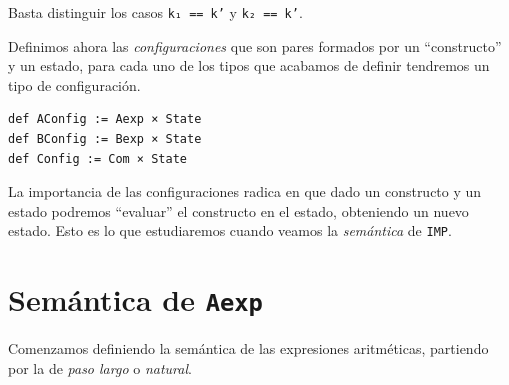 \documentclass[../main.tex]{subfiles}
\begin{document}
Basta distinguir los casos \texttt{k₁ == k'} y \texttt{k₂ == k'}.

Definimos ahora las \emph{configuraciones} que son pares formados por un 
\enquote{constructo} y un estado, para cada uno
de los tipos que acabamos de definir tendremos un tipo de configuración.

\begin{verbatim}
def AConfig := Aexp × State
def BConfig := Bexp × State
def Config := Com × State
\end{verbatim}

La importancia de las configuraciones radica en que dado un constructo y un estado
podremos \enquote{evaluar} el constructo en el estado, obteniendo un nuevo estado.
Esto es lo que estudiaremos cuando veamos la \emph{semántica} de \texttt{IMP}.

\section{Semántica de \texttt{Aexp}}

Comenzamos definiendo la semántica de las expresiones aritméticas, partiendo por
la de \emph{paso largo} o \emph{natural}.
\end{document}
